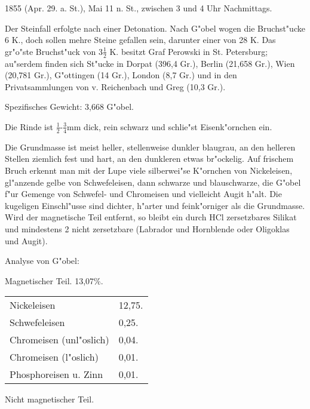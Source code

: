 \documentclass[a4paper, 11pt, oneside]{article}
\begin{document}
1855 (Apr. 29. a. St.), Mai 11 n. St., zwischen 3 und 4 Uhr Nachmittags.

Der Steinfall erfolgte nach einer Detonation. Nach G"obel wogen die Bruchst"ucke 6 K., doch sollen mehre Steine gefallen sein, darunter einer von 28 K. Das gr"o"ste Bruchst"uck von $\mathfrak{3\frac{1}{2}}$ K. besitzt Graf Perowski in St. Petersburg; au"serdem finden sich St"ucke in Dorpat (396,4 Gr.), Berlin (21,658 Gr.), Wien (20,781 Gr.), G"ottingen (14 Gr.), London (8,7 Gr.) und in den Privatsammlungen von v. Reichenbach und Greg (10,3 Gr.).

Spezifisches Gewicht: 3,668 G"obel.

Die Rinde ist $\mathfrak{\frac{1}{2}}$-$\mathfrak{\frac{3}{4}}$mm dick, rein schwarz und schlie"st Eisenk"ornchen ein.

Die Grundmasse ist meist heller, stellenweise dunkler blaugrau, an den helleren Stellen ziemlich fest und hart, an den dunkleren etwas br"ockelig. Auf frischem Bruch erkennt man mit der Lupe viele silberwei"se K"ornchen von Nickeleisen, gl"anzende gelbe von Schwefeleisen, dann schwarze und blauschwarze, die G"obel f"ur Gemenge von Schwefel- und Chromeisen und vielleicht Augit h"alt. Die kugeligen Einschl"usse sind dichter, h"arter und feink"orniger als die Grundmasse. Wird der magnetische Teil entfernt, so bleibt ein durch HCl zersetzbares Silikat und mindestens 2 nicht zersetzbare (Labrador und Hornblende oder Oligoklas und Augit).

Analyse von G"obel:
\begin{center}
Magnetischer Teil. 13,07\%.
\end{center}

\begin{table}[H]
    \centering\swabfamily\Large
    \begin{tabular}{l l}
        \hline
        Nickeleisen & 12,75. \\
        Schwefeleisen & 0,25. \\
        Chromeisen (unl"oslich) & 0,04. \\
        Chromeisen (l"oslich) & 0,01. \\
        Phosphoreisen u. Zinn  & 0,01. \\
    \end{tabular}
\end{table}

\begin{center}
Nicht magnetischer Teil.
\end{center}
\end{document}
